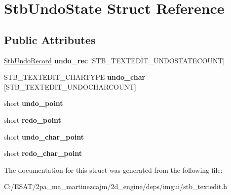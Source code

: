 \hypertarget{struct_stb_undo_state}{}\section{Stb\+Undo\+State Struct Reference}
\label{struct_stb_undo_state}
\subsection*{Public Attributes}
\begin{DoxyCompactItemize}
\item 
\mbox{\label{struct_stb_undo_state_a8cb07be8f304d1620b50bd024709023f}} 
\hyperlink{struct_stb_undo_record}{Stb\+Undo\+Record} {\bfseries undo\+\_\+rec} \mbox{[}S\+T\+B\+\_\+\+T\+E\+X\+T\+E\+D\+I\+T\+\_\+\+U\+N\+D\+O\+S\+T\+A\+T\+E\+C\+O\+U\+NT\mbox{]}
\item 
\mbox{\label{struct_stb_undo_state_a88320a054aaf18ca122c2b23903a8677}} 
S\+T\+B\+\_\+\+T\+E\+X\+T\+E\+D\+I\+T\+\_\+\+C\+H\+A\+R\+T\+Y\+PE {\bfseries undo\+\_\+char} \mbox{[}S\+T\+B\+\_\+\+T\+E\+X\+T\+E\+D\+I\+T\+\_\+\+U\+N\+D\+O\+C\+H\+A\+R\+C\+O\+U\+NT\mbox{]}
\item 
\mbox{\label{struct_stb_undo_state_ad29a8695b3e8252ac164d0c2d0be7d7c}} 
short {\bfseries undo\+\_\+point}
\item 
\mbox{\label{struct_stb_undo_state_a719ba014b2db8a8ea55739664b445af0}} 
short {\bfseries redo\+\_\+point}
\item 
\mbox{\label{struct_stb_undo_state_ad5c08b1f8c24678c44407f0ca805afcf}} 
short {\bfseries undo\+\_\+char\+\_\+point}
\item 
\mbox{\label{struct_stb_undo_state_a928f655e4af8945a14d99e944441704a}} 
short {\bfseries redo\+\_\+char\+\_\+point}
\end{DoxyCompactItemize}


The documentation for this struct was generated from the following file\+:\begin{DoxyCompactItemize}
\item 
C\+:/\+E\+S\+A\+T/2pa\+\_\+ma\+\_\+martinezcajm/2d\+\_\+engine/deps/imgui/stb\+\_\+textedit.\+h\end{DoxyCompactItemize}
